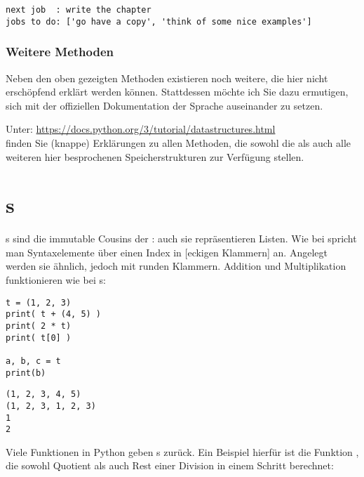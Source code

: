 \begin{cmdbox}[Ausgabe]
\begin{verbatim}
next job  : write the chapter
jobs to do: ['go have a copy', 'think of some nice examples']
\end{verbatim}
\end{cmdbox}

\subsubsection{Weitere Methoden}
Neben den oben gezeigten Methoden existieren noch weitere, die hier nicht erschöpfend erklärt werden können. Stattdessen möchte ich Sie dazu ermutigen, sich mit der offiziellen Dokumentation der Sprache auseinander zu setzen. 

Unter:\newline
\url{https://docs.python.org/3/tutorial/datastructures.html}\\
finden Sie (knappe) Erklärungen zu allen Methoden, die sowohl die  als auch alle weiteren hier besprochenen Speicherstrukturen zur Verfügung stellen.

\section{s}
s sind die immutable Cousins der : auch sie repräsentieren Listen. Wie bei  spricht man Syntaxelemente über einen Index in [eckigen Klammern] an. Angelegt werden sie ähnlich, jedoch mit runden Klammern. Addition und Multiplikation funktionieren wie bei s:

\begin{codebox}
\begin{verbatim}
t = (1, 2, 3)
print( t + (4, 5) )
print( 2 * t)
print( t[0] )

a, b, c = t
print(b)
\end{verbatim}
\end{codebox}

\begin{cmdbox}[Ausgabe]
\begin{verbatim}
(1, 2, 3, 4, 5)
(1, 2, 3, 1, 2, 3)
1
2
\end{verbatim}
\end{cmdbox}

Viele Funktionen in Python geben s zurück. Ein Beispiel hierfür ist die Funktion , die sowohl Quotient als auch Rest einer Division in einem Schritt berechnet:

